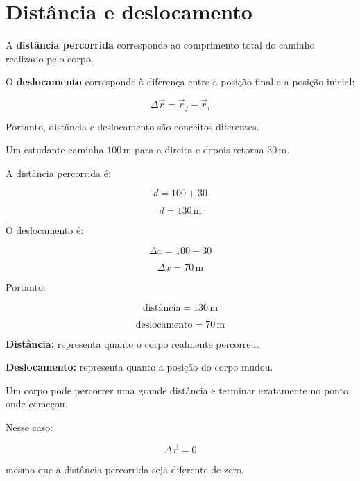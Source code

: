\documentclass[a4paper,12pt]{article}
\begin{document}
\section{Distância e deslocamento}

\begin{ideia}

A \textbf{distância percorrida} corresponde ao comprimento total
do caminho realizado pelo corpo.

O \textbf{deslocamento} corresponde à diferença entre a posição
final e a posição inicial:

\[
\boxed{
\Delta\vec r=\vec r_f-\vec r_i
}
\]

Portanto, distância e deslocamento são conceitos diferentes.

\end{ideia}


\begin{exemplo}

Um estudante caminha $100\,\text{m}$ para a direita e depois
retorna $30\,\text{m}$.

A distância percorrida é:

\[
d=100+30
\]

\[
\boxed{
d=130\,\text{m}
}
\]

O deslocamento é:

\[
\Delta x=100-30
\]

\[
\boxed{
\Delta x=70\,\text{m}
}
\]

Portanto:

\[
\boxed{
\text{distância}=130\,\text{m}
}
\]

\[
\boxed{
\text{deslocamento}=70\,\text{m}
}
\]

\end{exemplo}


\begin{atencao}

\textbf{Distância:} representa quanto o corpo realmente percorreu.

\textbf{Deslocamento:} representa quanto a posição do corpo mudou.

Um corpo pode percorrer uma grande distância e terminar exatamente
no ponto onde começou.

Nesse caso:

\[
\boxed{
\Delta\vec r=0
}
\]

mesmo que a distância percorrida seja diferente de zero.

\end{atencao}
\end{document}
